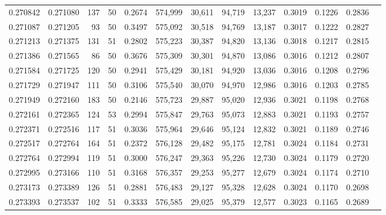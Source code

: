 \begin{tabular}{rrrrrrrrrrrrr}
0.270842 & 0.271080 &   137 &  50 &                                     0.2674 & 574,999 &  30,611 &  94,719 &  13,237 & 0.3019 & 0.1226 & 0.2836 \\
0.271087 & 0.271205 &    93 &  50 &                                     0.3497 & 575,092 &  30,518 &  94,769 &  13,187 & 0.3017 & 0.1222 & 0.2827 \\
0.271213 & 0.271375 &   131 &  51 &                                     0.2802 & 575,223 &  30,387 &  94,820 &  13,136 & 0.3018 & 0.1217 & 0.2815 \\
0.271386 & 0.271565 &    86 &  50 &                                     0.3676 & 575,309 &  30,301 &  94,870 &  13,086 & 0.3016 & 0.1212 & 0.2807 \\
0.271584 & 0.271725 &   120 &  50 &                                     0.2941 & 575,429 &  30,181 &  94,920 &  13,036 & 0.3016 & 0.1208 & 0.2796 \\
0.271729 & 0.271947 &   111 &  50 &                                     0.3106 & 575,540 &  30,070 &  94,970 &  12,986 & 0.3016 & 0.1203 & 0.2785 \\
0.271949 & 0.272160 &   183 &  50 &                                     0.2146 & 575,723 &  29,887 &  95,020 &  12,936 & 0.3021 & 0.1198 & 0.2768 \\
0.272161 & 0.272365 &   124 &  53 &                                     0.2994 & 575,847 &  29,763 &  95,073 &  12,883 & 0.3021 & 0.1193 & 0.2757 \\
0.272371 & 0.272516 &   117 &  51 &                                     0.3036 & 575,964 &  29,646 &  95,124 &  12,832 & 0.3021 & 0.1189 & 0.2746 \\
0.272517 & 0.272764 &   164 &  51 &                                     0.2372 & 576,128 &  29,482 &  95,175 &  12,781 & 0.3024 & 0.1184 & 0.2731 \\
0.272764 & 0.272994 &   119 &  51 &                                     0.3000 & 576,247 &  29,363 &  95,226 &  12,730 & 0.3024 & 0.1179 & 0.2720 \\
0.272995 & 0.273166 &   110 &  51 &                                     0.3168 & 576,357 &  29,253 &  95,277 &  12,679 & 0.3024 & 0.1174 & 0.2710 \\
0.273173 & 0.273389 &   126 &  51 &                                     0.2881 & 576,483 &  29,127 &  95,328 &  12,628 & 0.3024 & 0.1170 & 0.2698 \\
0.273393 & 0.273537 &   102 &  51 &                                     0.3333 & 576,585 &  29,025 &  95,379 &  12,577 & 0.3023 & 0.1165 & 0.2689 \\

\end{tabular}
